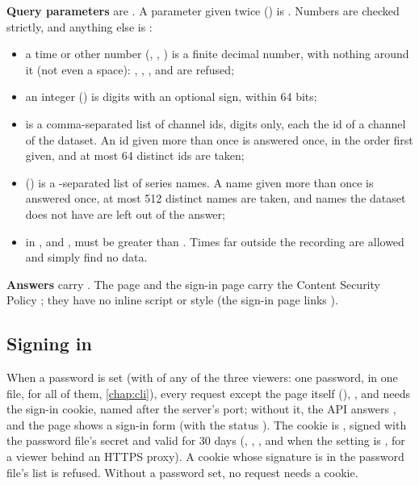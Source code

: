\textbf{Query parameters} are . A parameter given twice
() is . Numbers are checked strictly, and anything else is
:
\begin{itemize}
\item a time or other number (, , ) is a finite decimal number, with
  nothing around it (not even a space): , , ,  and
   are refused;
\item an integer () is digits with an optional sign, within 64 bits;
\item {} is a comma-separated list of channel ids, digits only, each the id of a channel
  of the dataset. An id given more than once is answered once, in the order first given, and at
  most 64 distinct ids are taken;
\item {} () is a \code{\textbar}-separated list of series names. A name
  given more than once is answered once, at most 512 distinct names are taken, and names the
  dataset does not have are left out of the answer;
\item in ,  and ,  must be greater than
  . Times far outside the recording are allowed and simply find no data.
\end{itemize}

\textbf{Answers} carry . The page and the sign-in page
carry the Content Security Policy ; they have no inline script or style (the sign-in page links ).

\subsection{Signing in}
\label{sec:viewer-api-signin}

When a password is set (with  of any of the three viewers: one password,
in one file, for all of them, \cref{chap:cli}), every request except the page itself
(), ,  and  needs the
sign-in cookie, named  after the server's port; without it, the API
answers  , and the page shows a sign-in form
(with the status ). The cookie is
, signed with the password
file's secret and valid for 30 days (, , , and
 when the setting  is , for a viewer behind an HTTPS
proxy). A cookie whose signature is in the password file's  list is refused.
Without a password set, no request needs a cookie.

